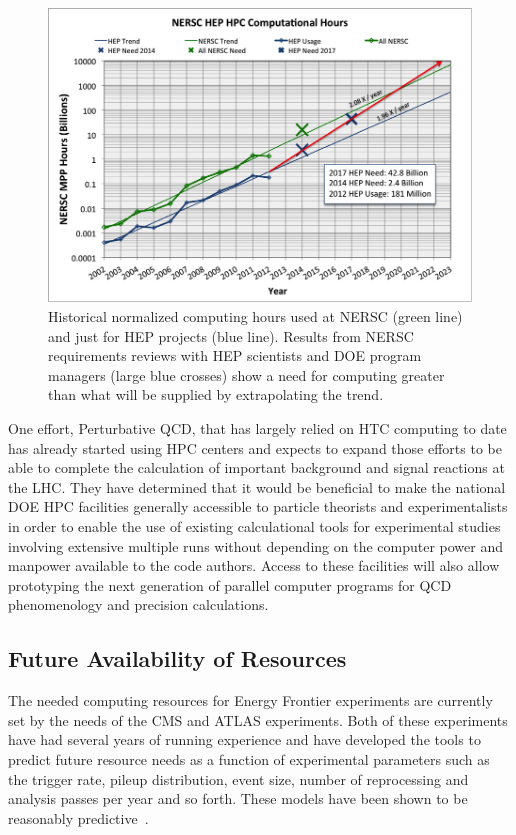 \begin{figure}[h]
\includegraphics[width=\textwidth]{CpF-I2/images/2013-NERSC-Usage-HEP.png}
\caption{Historical normalized computing hours used at NERSC (green line) and just for HEP projects (blue line). Results from NERSC requirements reviews with HEP scientists and DOE program managers (large blue crosses) show a need for computing greater than what will be supplied by extrapolating the trend.}
\label{fig:NERSC-Computational-Hours}
\end{figure}


One effort, Perturbative QCD,  that has largely relied on HTC computing to date has already started using HPC centers and expects to 
expand those efforts to be able to complete the calculation of important background and signal reactions at the
LHC.  
They have determined that it would be beneficial to make the national DOE HPC
facilities 
generally accessible to particle theorists and
experimentalists in order to enable the use of existing
calculational tools for experimental studies involving extensive
multiple runs without depending on the computer power and manpower
available to the code authors. Access to these facilities will also
allow prototyping the next generation of parallel computer programs
for QCD phenomenology and precision calculations.

 
\subsection{Future Availability of Resources}


The needed computing resources for Energy Frontier experiments are currently set by the needs of the CMS and ATLAS experiments.  Both of these experiments have had several years of running experience and have developed the tools to predict future resource needs as a function of experimental parameters such as the trigger rate, pileup distribution, event size, number of reprocessing and analysis passes per year and so forth.  These models have been shown to be reasonably predictive~\cite{bib:CHEPresources}.

